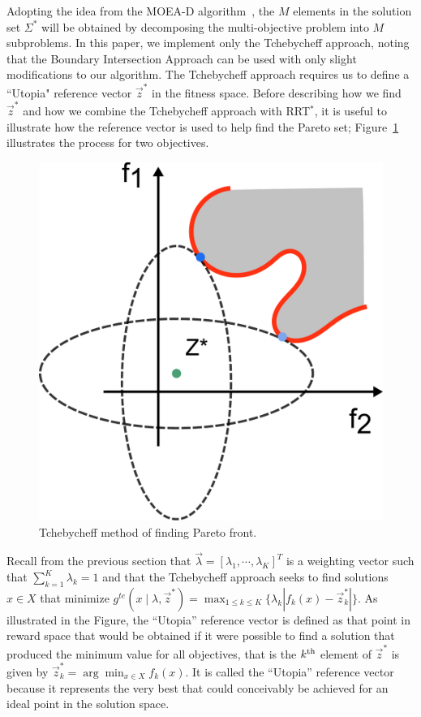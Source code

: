 \documentclass[conference]{IEEEtran}
\begin{document}
Adopting the idea from the MOEA-D algorithm~\cite{4358754}, the $M$ elements in the solution set $\Sigma^{*}$ will be obtained by decomposing the multi-objective problem into $ M $ subproblems.  
In this paper, we implement only the Tchebycheff approach, noting that the Boundary Intersection Approach can be used with only slight modifications to our algorithm. The Tchebycheff approach requires us to define a ``Utopia" reference vector $ \vec{z}^{*} $ in the fitness space. 
Before describing how we find $ \vec{z}^{*} $ and how we combine the Tchebycheff approach with RRT$^{*}$, it is useful to illustrate how the reference vector is used to help find the Pareto set; Figure~\ref{fig:Tchebycheff} illustrates the process for two objectives.  
\begin{figure}
\centering
\includegraphics[width=0.9\linewidth]{fig/Tchebycheff.pdf}
\caption{Tchebycheff method of finding Pareto front.}
\label{fig:Tchebycheff}
\end{figure}
Recall from the previous section that  $ \vec{\lambda} = [ \lambda_{1} , \cdots , \lambda_{K}  ]^{T} $ is a weighting vector such that $ \sum_{k=1}^{K} \lambda_{k} = 1 $ and that the Tchebycheff approach seeks to find solutions $ x\in X $ that minimize $ g^{te} (x \mid \lambda , \vec{z}^{*}) = \max_{1 \leq k \leq K}  \{ \lambda_{k} | f_{k}(x) - \vec{z}^{*}_{k}  | \} $.  
As illustrated in the Figure, the ``Utopia'' reference vector is defined as that point in reward space that would be obtained if it were possible to find a solution that produced the minimum value for all objectives, that is the $k^{\rm th}$ element of $\vec{z}^*$ is given by $\vec{z}^{*}_{k} = \arg \min_{x \in X} f_{k}(x)$.  
It is called the ``Utopia'' reference vector because it represents the very best that could conceivably be achieved for an ideal point in the solution space.
\end{document}
